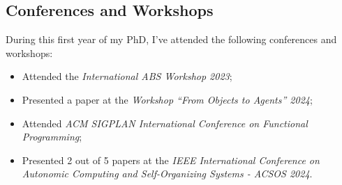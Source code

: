 \documentclass[runningheads]{llncs}
\begin{document}
\subsection{Conferences and Workshops}

During this first year of my PhD,
I've attended the following conferences and workshops:

\begin{itemize}
    \item Attended the \emph{International ABS Workshop 2023};
    \item Presented a paper at the \emph{Workshop ``From Objects to Agents'' 2024};
    \item Attended \emph{ACM SIGPLAN International Conference on Functional Programming};
    \item Presented 2 out of 5 papers at the \emph{IEEE International Conference on Autonomic Computing and Self-Organizing Systems - ACSOS 2024}.
\end{itemize}






\end{document}
